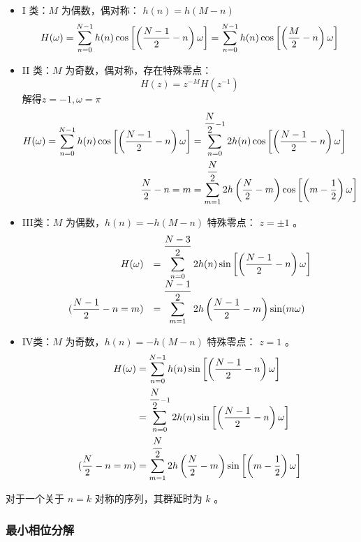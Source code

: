 \documentclass[cn,11pt,chinese,black,simple]{elegantbook}
\begin{document}
\begin{itemize}
    \item I 类：\(M\) 为偶数，偶对称： \(h(n) = h(M-n)\) \[
        H(\omega)=\displaystyle\sum_{n=0}^{N-1} h(n) \cos \left[\left(\dfrac{N-1}{2}-n\right) \omega\right] = \displaystyle\sum_{n=0}^{N-1} h(n) \cos \left[\left(\dfrac{M}{2}-n\right) \omega\right]
        \]
    \item II 类：\(M\) 为奇数，偶对称，存在特殊零点： \[
        H(z)=z^{-M} H\left(z^{-1}\right)
        \] 解得\(z = -1, \omega = \pi\) \[
            \begin{aligned}
            H(\omega)=\displaystyle\sum_{n=0}^{N-1} h(n) \cos \left[\left(\dfrac{N-1}{2}-n\right) \omega\right] &=\displaystyle\sum_{n=0}^{\dfrac{N}{2}-1} 2 h(n) \cos \left[\left(\dfrac{N-1}{2}-n\right) \omega\right] \\
            \text {  } \dfrac{N}{2}-n=m &=\displaystyle\sum_{m=1}^{\dfrac{N}{2}} 2 h\left(\dfrac{N}{2}-m\right) \cos \left[\left(m-\dfrac{1}{2}\right) \omega\right]
            \end{aligned}
            \]
    \item III类：\(M\) 为偶数，\(h(n) = -h(M-n)\) 特殊零点： \(z = \pm 1\) 。\[
        \begin{array}{rl}
        H(\omega) & =\displaystyle\sum_{n=0}^{\dfrac{N-3}{2}} 2 h(n) \sin \left[\left(\dfrac{N-1}{2}-n\right) \omega\right] \\
         (\dfrac{N-1}{2}-n=m) & =\displaystyle\sum_{m=1}^{\dfrac{N-1}{2}} 2 h\left(\dfrac{N-1}{2}-m\right) \sin (m \omega)
        \end{array}
        \]
    \item IV类：\(M\) 为奇数，\(h(n) = -h(M-n)\) 特殊零点： \(z = 1\) 。\[
            \begin{aligned}
                H(\omega)&=\displaystyle\sum_{n=0}^{N-1} h(n) \sin \left[\left(\dfrac{N-1}{2}-n\right) \omega\right] \\
                & =\displaystyle\sum_{n=0}^{\dfrac{N}{2}-1} 2 h(n) \sin \left[\left(\dfrac{N-1}{2}-n\right) \omega\right] \\
                (\dfrac{N}{2}-n=m) &=\displaystyle\sum_{m=1}^{\dfrac{N}{2}} 2 h\left(\dfrac{N}{2}-m\right) \sin \left[\left(m-\dfrac{1}{2}\right) \omega\right]
            \end{aligned}
        \]
\end{itemize}

对于一个关于 \(n = k\) 对称的序列，其群延时为 \(k\) 。

\subsubsection{最小相位分解}
\end{document}
